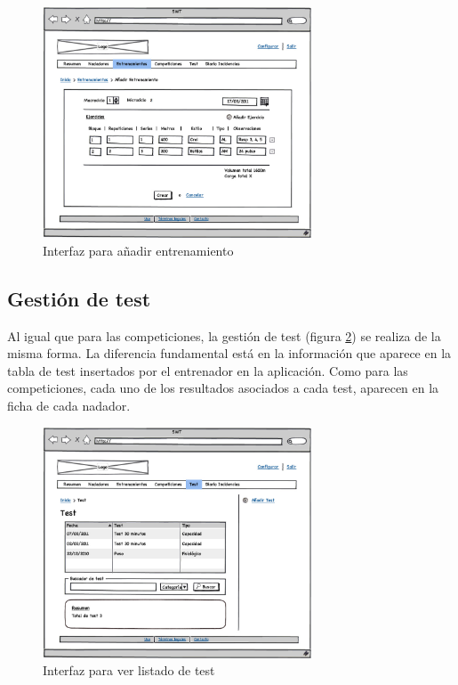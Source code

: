   		\begin{figure}[H]
  		  \centering
  		    \includegraphics[width=8cm]{./eps/p_interfaz/19_Entrenamientos_new.eps}
  		  \caption{Interfaz para añadir entrenamiento}
  		  \label{fig:interfaz_entrenamientos_new}
  		\end{figure}


  	\subsection{Gestión de test} %
  		\label{sub:gestion_de_test}

  	Al igual que para las competiciones, la gestión de test (figura \ref{fig:interfaz_test}) se realiza de la misma forma. La diferencia fundamental está en la información que aparece en la tabla de test insertados por el entrenador en la aplicación. Como para las competiciones, cada uno de los resultados asociados a cada test, aparecen en la ficha de cada nadador.

  		\begin{figure}[H]
  		  \centering
  		    \includegraphics[width=8cm]{./eps/p_interfaz/26_Test.eps}
  		  \caption{Interfaz para ver listado de test}
  		  \label{fig:interfaz_test}
  		\end{figure}

